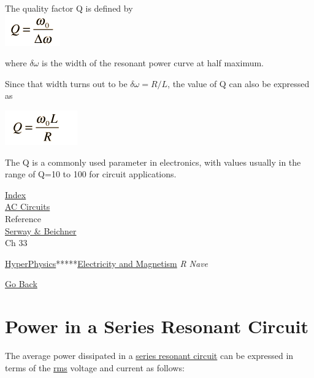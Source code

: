 The quality factor Q is defined by\\

\includegraphics{./resonant-rlc-circuits_files/qdef.png}

where $\delta \omega$ is the width of the resonant power curve at half maximum.\strut

Since that width turns out to be $\delta \omega =R/L$, the value of Q can also be
expressed as

\includegraphics{./resonant-rlc-circuits_files/qdef2.png}

The Q is a commonly used parameter in electronics, with values usually
in the range of Q=10 to 100 for circuit applications.\strut
\href{http://hyperphysics.phy-astr.gsu.edu/hbase/hframe.html}{Index}\\[2\baselineskip]\href{http://hyperphysics.phy-astr.gsu.edu/hbase/electric/accircon.html\#c1}{AC
Circuits}\\[2\baselineskip]Reference\\
\href{http://hyperphysics.phy-astr.gsu.edu/hbase/electric/eleref.html\#c1}{Serway
\& Beichner}\\
Ch 33\strut

\href{http://hyperphysics.phy-astr.gsu.edu/hbase/hph.html}{HyperPhysics}*****\href{http://hyperphysics.phy-astr.gsu.edu/hbase/emcon.html\#emcon}{Electricity
and Magnetism}  \emph{R Nave}

\href{Javascript:history.go(-1)}{Go Back}\strut


\protect\hypertarget{c4}{}{}

\section{Power in a Series Resonant
Circuit}\label{power-in-a-series-resonant-circuit}

The average power dissipated in a
\href{http://hyperphysics.phy-astr.gsu.edu/hbase/electric/serres.html\#c2}{series
resonant circuit} can be expressed in terms of the
\href{http://hyperphysics.phy-astr.gsu.edu/hbase/electric/acres.html\#c2}{rms}
voltage and current as follows:

